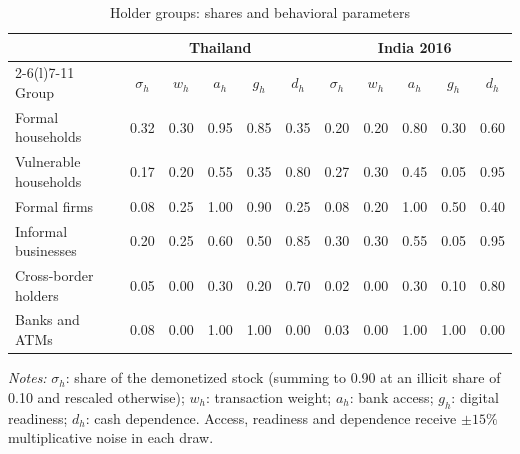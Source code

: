 \documentclass[11pt]{article}
\theoremstyle{definition}
\theoremstyle{remark}
\begin{document}
\begin{table}[!htbp]\centering\footnotesize
\caption{Holder groups: shares and behavioral parameters}\label{tab:holders}
\begin{tabular}{@{}lccccc@{\hspace{14pt}}ccccc@{}}
\toprule
& \multicolumn{5}{c}{Thailand} & \multicolumn{5}{c}{India 2016}\\
\cmidrule(lr){2-6}\cmidrule(l){7-11}
Group & $\sigma_h$ & $w_h$ & $a_h$ & $g_h$ & $d_h$ & $\sigma_h$ & $w_h$ & $a_h$ & $g_h$ & $d_h$\\
\midrule
Formal households & 0.32 & 0.30 & 0.95 & 0.85 & 0.35 & 0.20 & 0.20 & 0.80 & 0.30 & 0.60\\
Vulnerable households & 0.17 & 0.20 & 0.55 & 0.35 & 0.80 & 0.27 & 0.30 & 0.45 & 0.05 & 0.95\\
Formal firms & 0.08 & 0.25 & 1.00 & 0.90 & 0.25 & 0.08 & 0.20 & 1.00 & 0.50 & 0.40\\
Informal businesses & 0.20 & 0.25 & 0.60 & 0.50 & 0.85 & 0.30 & 0.30 & 0.55 & 0.05 & 0.95\\
Cross-border holders & 0.05 & 0.00 & 0.30 & 0.20 & 0.70 & 0.02 & 0.00 & 0.30 & 0.10 & 0.80\\
Banks and ATMs & 0.08 & 0.00 & 1.00 & 1.00 & 0.00 & 0.03 & 0.00 & 1.00 & 1.00 & 0.00\\
\bottomrule
\end{tabular}
\par\smallskip\scriptsize\textit{Notes:} $\sigma_h$: share of the demonetized stock (summing to 0.90 at an illicit share of
0.10 and rescaled otherwise); $w_h$: transaction weight; $a_h$: bank access; $g_h$: digital readiness; $d_h$: cash
dependence. Access, readiness and dependence receive $\pm15\%$ multiplicative noise in each draw.
\end{table}
\end{document}
